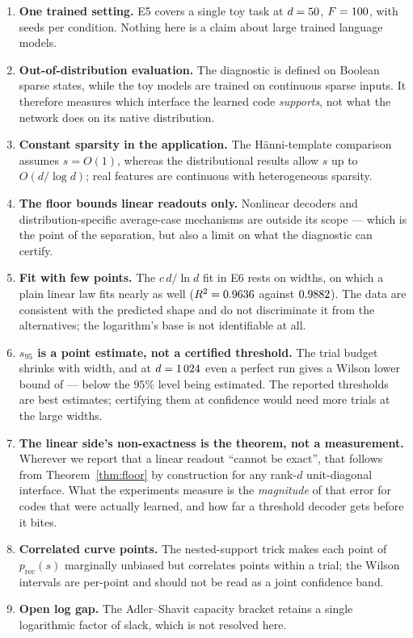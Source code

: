 \documentclass[preprint,12pt]{elsarticle}
\theoremstyle{definition}
\begin{document}
\begin{enumerate}[leftmargin=*,itemsep=1pt]
\item \textbf{One trained setting.} E5 covers a single toy task at $d=50$, $F=100$,
with \EfiveSeeds{} seeds per condition. Nothing here is a claim about large trained language
models.
\item \textbf{Out-of-distribution evaluation.} The diagnostic is defined on Boolean sparse
states, while the toy models are trained on continuous sparse inputs. It therefore measures
which interface the learned code \emph{supports}, not what the network does on its native
distribution.
\item \textbf{Constant sparsity in the application.} The H\"{a}nni-template comparison assumes
$s=O(1)$, whereas the distributional results allow $s$ up to $O(d/\log d)$; real features are
continuous with heterogeneous sparsity.
\item \textbf{The floor bounds linear readouts only.} Nonlinear decoders and
distribution-specific average-case mechanisms are outside its scope --- which is the point of
the separation, but also a limit on what the diagnostic can certify.
\item \textbf{Fit with few points.} The $c\,d/\ln d$ fit in E6 rests on \EsixFitPoints{}
widths, on which a plain linear law fits nearly as well ($R^2=0.9636$ against
$0.9882$). The data are consistent with the predicted shape and do not discriminate
it from the alternatives; the logarithm's base is not identifiable at all.

\item \textbf{$s_{95}$ is a point estimate, not a certified threshold.} The trial budget shrinks
with width, and at $d=1\,024$ even a perfect run gives a Wilson lower bound of
\EsixTopBestWilsonLow --- below the $95\%$ level being estimated. The reported thresholds are
best estimates; certifying them at confidence would need more trials at the large widths.

\item \textbf{The linear side's non-exactness is the theorem, not a measurement.} Wherever we
report that a linear readout ``cannot be exact'', that follows from
Theorem~\ref{thm:floor} by construction for any rank-$d$ unit-diagonal interface. What the
experiments measure is the \emph{magnitude} of that error for codes that were actually learned,
and how far a threshold decoder gets before it bites.
\item \textbf{Correlated curve points.} The nested-support trick makes each point of
$p_{\mathrm{rec}}(s)$ marginally unbiased but correlates points within a trial; the Wilson
intervals are per-point and should not be read as a joint confidence band.
\item \textbf{Open log gap.} The Adler--Shavit capacity bracket retains a single logarithmic
factor of slack, which is not resolved here.


\end{enumerate}
\end{document}
